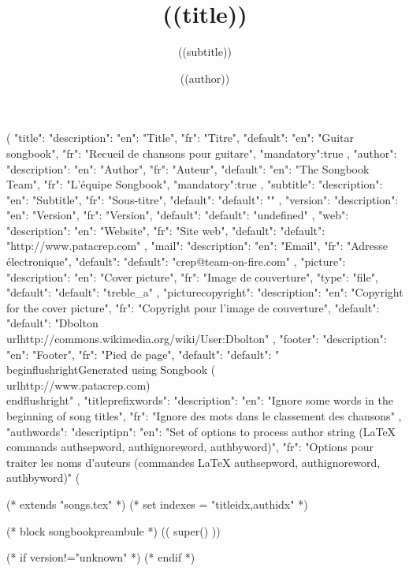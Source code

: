 (%
{
"title": {"description": {"en": "Title", "fr": "Titre"},
            "default": {"en": "Guitar songbook", "fr": "Recueil de chansons pour guitare"},
            "mandatory":true
         },
"author": {"description": {"en": "Author", "fr": "Auteur"},
            "default": {"en": "The Songbook Team", "fr": "L'équipe Songbook"},
            "mandatory":true
         },
"subtitle": {"description": {"en": "Subtitle", "fr": "Sous-titre"},
            "default": {"default": ""}
            },
"version":{ "description": {"en": "Version", "fr": "Version"},
            "default": {"default": "undefined"}
         },
"web": {"description": {"en": "Website", "fr": "Site web"},
         "default": {"default": "http://www.patacrep.com"}
      },
"mail": {"description": {"en": "Email", "fr": "Adresse électronique"},
         "default": {"default": "crep@team-on-fire.com"}
      },
"picture": {"description": {"en": "Cover picture", "fr": "Image de couverture"},
            "type": "file",
            "default": {"default": "treble_a"}
         },
"picturecopyright": {"description": {"en": "Copyright for the cover picture", "fr": "Copyright pour l'image de couverture"},
                     "default": {"default": "Dbolton \\url{http://commons.wikimedia.org/wiki/User:Dbolton}"}
                  },
"footer": {"description": {"en": "Footer", "fr": "Pied de page"},
           "default": {"default": "\\begin{flushright}Generated using Songbook (\\url{http://www.patacrep.com})\\end{flushright}"}
        },
"titleprefixwords": {"description": {"en": "Ignore some words in the beginning of song titles",
                                     "fr": "Ignore des mots dans le classement des chansons"}
                     },
"authwords": {"descriptipn": {"en": "Set of options to process author string (LaTeX commands authsepword, authignoreword, authbyword)",
                              "fr": "Options pour traiter les noms d'auteurs (commandes LaTeX authsepword, authignoreword, authbyword)"}
               }
}
(%

(* extends "songs.tex" *)
(* set indexes = "titleidx,authidx" *)

(* block songbookpreambule *)
   (( super() ))

  \usepackage{chords}

   \title{((title))}
   \author{((author))}
   \subtitle{((subtitle))}
   (* if version!="unknown" *)
   (* endif *)

